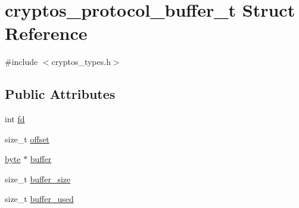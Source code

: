 \hypertarget{structcryptos__protocol__buffer__t}{
\section{cryptos\_\-protocol\_\-buffer\_\-t Struct Reference}
\label{structcryptos__protocol__buffer__t}
}


{\ttfamily \#include $<$cryptos\_\-types.h$>$}\subsection*{Public Attributes}
\begin{DoxyCompactItemize}
\item 
int \hyperlink{structcryptos__protocol__buffer__t_a63a8f5b70415ffa8c59dcd7b783398c8}{fd}
\item 
size\_\-t \hyperlink{structcryptos__protocol__buffer__t_abfbda774fe7657594b8ccc1a17f32d15}{offset}
\item 
\hyperlink{global__types_8h_a0c8186d9b9b7880309c27230bbb5e69d}{byte} $\ast$ \hyperlink{structcryptos__protocol__buffer__t_a06a239a5294eecb4b8cbf4e176f601f8}{buffer}
\item 
size\_\-t \hyperlink{structcryptos__protocol__buffer__t_a3e75fb39440a18d4eda8b756ffea773d}{buffer\_\-size}
\item 
size\_\-t \hyperlink{structcryptos__protocol__buffer__t_a537d72e9b1d579ecc4aaf0f00747d3b0}{buffer\_\-used}
\end{DoxyCompactItemize}


